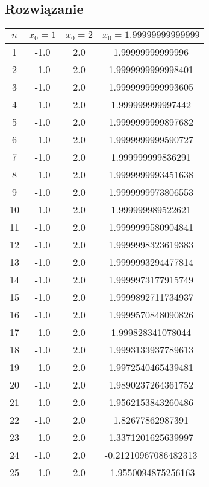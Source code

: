 \documentclass{article}
\begin{document}
\begin{center}
    \subsection{Rozwiązanie}
        \begin{table}[h]
        \centering
        \begin{tabular}{|c|c|c|c|}
        \hline
        $n$ & $x_0=1$ & $x_0=2$ & $x_0 = 1.99999999999999$ \\
        \hline
        1 & -1.0 & 2.0 & 1.99999999999996 \\
        2 & -1.0 & 2.0 & 1.9999999999998401 \\
        3 & -1.0 & 2.0 & 1.9999999999993605 \\
        4 & -1.0 & 2.0 & 1.999999999997442 \\
        5 & -1.0 & 2.0 & 1.9999999999897682 \\
        6 & -1.0 & 2.0 & 1.9999999999590727 \\
        7 & -1.0 & 2.0 & 1.999999999836291 \\
        8 & -1.0 & 2.0 & 1.9999999993451638 \\
        9 & -1.0 & 2.0 & 1.9999999973806553 \\
        10 & -1.0 & 2.0 & 1.999999989522621 \\
        11 & -1.0 & 2.0 & 1.9999999580904841 \\
        12 & -1.0 & 2.0 & 1.9999998323619383 \\
        13 & -1.0 & 2.0 & 1.9999993294477814 \\
        14 & -1.0 & 2.0 & 1.9999973177915749 \\
        15 & -1.0 & 2.0 & 1.9999892711734937 \\
        16 & -1.0 & 2.0 & 1.9999570848090826 \\
        17 & -1.0 & 2.0 & 1.999828341078044 \\
        18 & -1.0 & 2.0 & 1.9993133937789613 \\
        19 & -1.0 & 2.0 & 1.9972540465439481 \\
        20 & -1.0 & 2.0 & 1.9890237264361752 \\
        21 & -1.0 & 2.0 & 1.9562153843260486 \\
        22 & -1.0 & 2.0 & 1.82677862987391 \\
        23 & -1.0 & 2.0 & 1.3371201625639997 \\
        24 & -1.0 & 2.0 & -0.21210967086482313 \\
        25 & -1.0 & 2.0 & -1.9550094875256163 \\

\end{tabular}
\end{table}
\end{center}
\end{document}
